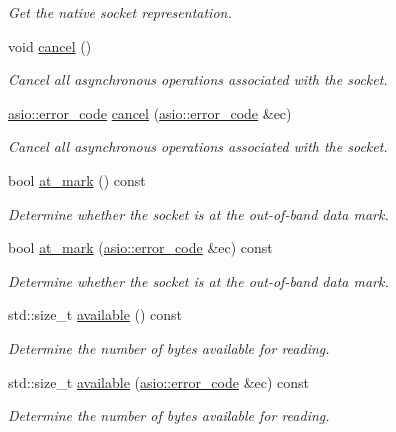 \begin{DoxyCompactItemize}
\begin{DoxyCompactList}\small\item\em Get the native socket representation. \end{DoxyCompactList}\item 
void \hyperlink{classasio_1_1basic__socket_a8c93c7f90a9c2b44e1bedfa8f2fe63c8}{cancel} ()
\begin{DoxyCompactList}\small\item\em Cancel all asynchronous operations associated with the socket. \end{DoxyCompactList}\item 
\hyperlink{classasio_1_1error__code}{asio\+::error\+\_\+code} \hyperlink{classasio_1_1basic__socket_a1128f1e16ef26eb7fa9328548a2a08e9}{cancel} (\hyperlink{classasio_1_1error__code}{asio\+::error\+\_\+code} \&ec)
\begin{DoxyCompactList}\small\item\em Cancel all asynchronous operations associated with the socket. \end{DoxyCompactList}\item 
bool \hyperlink{classasio_1_1basic__socket_a422ad513017a89509c0a727aab7ce12e}{at\+\_\+mark} () const 
\begin{DoxyCompactList}\small\item\em Determine whether the socket is at the out-\/of-\/band data mark. \end{DoxyCompactList}\item 
bool \hyperlink{classasio_1_1basic__socket_a2fb2030562128667c88fe5f8cf613aa3}{at\+\_\+mark} (\hyperlink{classasio_1_1error__code}{asio\+::error\+\_\+code} \&ec) const 
\begin{DoxyCompactList}\small\item\em Determine whether the socket is at the out-\/of-\/band data mark. \end{DoxyCompactList}\item 
std\+::size\+\_\+t \hyperlink{classasio_1_1basic__socket_a7646d06f9aaf8812446f8b5567f7e30e}{available} () const 
\begin{DoxyCompactList}\small\item\em Determine the number of bytes available for reading. \end{DoxyCompactList}\item 
std\+::size\+\_\+t \hyperlink{classasio_1_1basic__socket_af32340508e7c17e124418ebd1f48a0e4}{available} (\hyperlink{classasio_1_1error__code}{asio\+::error\+\_\+code} \&ec) const 
\begin{DoxyCompactList}\small\item\em Determine the number of bytes available for reading. \end{DoxyCompactList}\item 

\end{DoxyCompactItemize}
